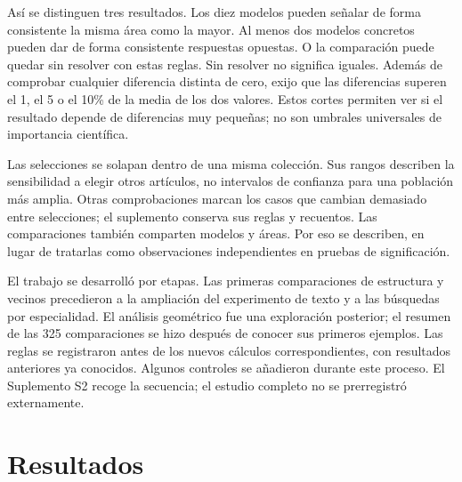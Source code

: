 Así se distinguen tres resultados. Los diez modelos pueden señalar de forma consistente la misma área como la mayor. Al menos dos modelos concretos pueden dar de forma consistente respuestas opuestas. O la comparación puede quedar sin resolver con estas reglas. Sin resolver no significa iguales. Además de comprobar cualquier diferencia distinta de cero, exijo que las diferencias superen el 1, el 5 o el 10\% de la media de los dos valores. Estos cortes permiten ver si el resultado depende de diferencias muy pequeñas; no son umbrales universales de importancia científica.

Las selecciones se solapan dentro de una misma colección. Sus rangos describen la sensibilidad a elegir otros artículos, no intervalos de confianza para una población más amplia. Otras comprobaciones marcan los casos que cambian demasiado entre selecciones; el suplemento conserva sus reglas y recuentos. Las comparaciones también comparten modelos y áreas. Por eso se describen, en lugar de tratarlas como observaciones independientes en pruebas de significación.

El trabajo se desarrolló por etapas. Las primeras comparaciones de estructura y vecinos precedieron a la ampliación del experimento de texto y a las búsquedas por especialidad. El análisis geométrico fue una exploración posterior; el resumen de las 325 comparaciones se hizo después de conocer sus primeros ejemplos. Las reglas se registraron antes de los nuevos cálculos correspondientes, con resultados anteriores ya conocidos. Algunos controles se añadieron durante este proceso. El Suplemento S2 recoge la secuencia; el estudio completo no se prerregistró externamente.

\section{Resultados}
